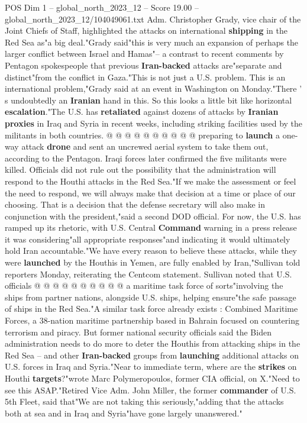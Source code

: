 \begin{textsample}{POS Dim 1 – global\_north\_2023\_12 – Score 19.00 – global\_north\_2023\_12/104049061.txt}
Adm.
Christopher Grady, vice chair of the Joint Chiefs of Staff, highlighted the attacks on international \textbf{shipping} in the Red Sea as"a big deal."Grady said"this is very much an expansion of perhaps the larger conflict between Israel and Hamas"-- a contrast to recent comments by Pentagon spokespeople that previous \textbf{Iran-backed} attacks are"separate and distinct"from the conflict in Gaza."This is not just a U.S. problem.
This is an international problem,"Grady said at an event in Washington on Monday."There ' s undoubtedly an \textbf{Iranian} hand in this.
So this looks a little bit like horizontal \textbf{escalation}."The U.S. has \textbf{retaliated} against dozens of attacks by \textbf{Iranian} \textbf{proxies} in Iraq and Syria in recent weeks, including striking facilities used by the militants in both countries. @ @ @ @ @ @ @ @ @ @ preparing to \textbf{launch} a one-way attack \textbf{drone} and sent an uncrewed aerial system to take them out, according to the Pentagon.
Iraqi forces later confirmed the five militants were killed.
Officials did not rule out the possibility that the administration will respond to the Houthi attacks in the Red Sea."If we make the assessment or feel the need to respond, we will always make that decision at a time or place of our choosing.
That is a decision that the defense secretary will also make in conjunction with the president,"said a second DOD official.
For now, the U.S. has ramped up its rhetoric, with U.S.
Central \textbf{Command} warning in a press release it was considering"all appropriate responses"and indicating it would ultimately hold Iran accountable."We have every reason to believe these attacks, while they were \textbf{launched} by the Houthis in Yemen, are fully enabled by Iran,"Sullivan told reporters Monday, reiterating the Centcom statement.
Sullivan noted that U.S. officials @ @ @ @ @ @ @ @ @ @ a maritime task force of sorts"involving the ships from partner nations, alongside U.S. ships, helping ensure"the safe passage of ships in the Red Sea."A similar task force already exists : Combined Maritime Forces, a 38-nation maritime partnership based in Bahrain focused on countering terrorism and piracy.
But former national security officials said the Biden administration needs to do more to deter the Houthis from attacking ships in the Red Sea -- and other \textbf{Iran-backed} groups from \textbf{launching} additional attacks on U.S. forces in Iraq and Syria."Near to immediate term, where are the \textbf{strikes} on Houthi \textbf{targets}?"wrote Marc Polymeropoulos, former CIA official, on X."Need to see this ASAP."Retired Vice Adm.
John Miller, the former \textbf{commander} of U.S. 5th Fleet, said that"We are not taking this seriously,"adding that the attacks both at sea and in Iraq and Syria"have gone largely unanswered."

\end{textsample}
